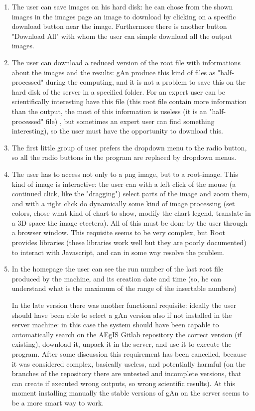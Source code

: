 \begin{enumerate}
\item The user can save images on his hard disk: he can chose from the shown images in the images page an image to download by clicking on a specific download button near the image. Furthermore there is another button "Download All" with whom the user can simple download all the output images.

\item The user can download a reduced version of the root file with informations about the images and the results: gAn produce this kind of files as "half-processed" during the computing, and it is not a problem to save this on the hard disk of the server in a specified folder. For an expert user can be scientifically interesting have this file (this root file contain more information than the output, the most of this information is useless (it is an "half-processed" file) , but sometimes an expert user can find something interesting), so the user must have the opportunity to download this.     

\item The first little group of user prefers the dropdown menu to the radio button, so all the radio buttons in the program are replaced by dropdown menus.

\item The user has to access not only to a png image, but to a root-image. This kind of image is interactive: the user can with a left click of the mouse (a continued click, like the "dragging") select parts of the image and zoom them, and with a right click do dynamically some kind of image processing (set colors, chose  what kind of chart to show, modify the chart legend, translate in a 3D space the image etcetera). All of this must be done by the user through a browser window.  This requisite seems to be very complex, but Root provides libraries (these libraries work well but they are poorly documented) to interact with Javascript, and can in some way resolve the problem.  

\item In the homepage the user can see the run number of the last root file produced by the machine, and its creation date and time (so, he can understand what is the maximum of the range of the insertable numbers) 

In the late version there was another functional requisite: ideally the user should have been able to select a gAn version also if not installed in the server machine: in this case the system should have been capable to automatically search on the AEgIS Gitlab repository the correct version (if existing), download it, unpack it in the server, and use it to execute the program. 
After some discussion this requirement has been cancelled, because it was considered complex, basically useless, and potentially harmful (on the branches of the repository there are untested and incomplete versions, that can create if executed wrong outputs, so wrong scientific results). At this moment installing manually the stable versions of gAn on the server seems to be a more smart way to work.

\end{enumerate}

